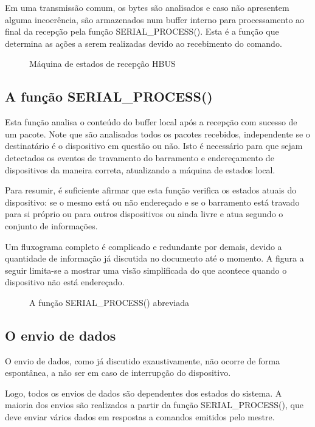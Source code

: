 \documentclass[11pt]{report}
\begin{document}
Em uma transmissão comum, os bytes são analisados e caso não apresentem alguma incoerência, são armazenados num buffer interno para processamento ao final da recepção pela função SERIAL\_PROCESS(). Esta é a função que determina as ações a serem realizadas devido ao recebimento do comando.

\begin{figure}[H]
\centering

\caption{Máquina de estados de recepção HBUS}
\label{fig:hbussm}
\end{figure}

\subsection{A função SERIAL\_PROCESS()}

Esta função analisa o conteúdo do buffer local após a recepção com sucesso de um pacote. Note que são analisados todos os pacotes recebidos, independente se o destinatário é o dispositivo em questão ou não. Isto é necessário para que sejam detectados os eventos de travamento do barramento e endereçamento de dispositivos da maneira correta, atualizando a máquina de estados local.

Para resumir, é suficiente afirmar que esta função verifica os estados atuais do dispositivo: se o mesmo está ou não endereçado e se o barramento está travado para si próprio ou para outros dispositivos ou ainda livre e atua segundo o conjunto de informações.

Um fluxograma completo é complicado e redundante por demais, devido a quantidade de informação já discutida no documento até o momento. A figura a seguir limita-se a mostrar uma visão simplificada do que acontece quando o dispositivo não está endereçado.

\begin{figure}[H]
\centering

\caption{A função SERIAL\_PROCESS() abreviada}
\end{figure}

\subsection{O envio de dados}

O envio de dados, como já discutido exaustivamente, não ocorre de forma espontânea, a não ser em caso de interrupção do dispositivo.

Logo, todos os envios de dados são dependentes dos estados do sistema. A maioria dos envios são realizados a partir da função SERIAL\_PROCESS(), que deve enviar vários dados em respostas a comandos emitidos pelo mestre.
\end{document}
